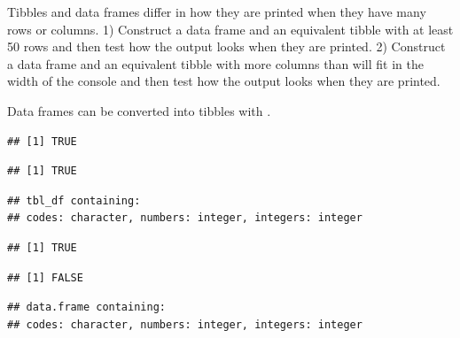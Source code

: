 \documentclass[krantz2]{krantz}\usepackage{knitr}
\begin{document}
\begin{playground}
Tibbles and data frames differ in how they are printed when they have many rows or columns. 1) Construct a data frame and an equivalent tibble with at least 50 rows and then test how the output looks when they are printed. 2) Construct a data frame and an equivalent tibble with more columns than will fit in the width of the \R console and then test how the output looks when they are printed.
\end{playground}

Data frames can be converted into tibbles with .

\begin{knitrout}\footnotesize
{}\color{fgcolor}\begin{kframe}
\begin{alltt}
 \hlkwb{<-} 
\end{alltt}
\begin{verbatim}
## [1] TRUE
\end{verbatim}
\begin{alltt}
\end{alltt}
\begin{verbatim}
## [1] TRUE
\end{verbatim}
\begin{alltt}
\end{alltt}
\begin{verbatim}
## tbl_df containing:
## codes: character, numbers: integer, integers: integer
\end{verbatim}
\end{kframe}
\end{knitrout}

\begin{knitrout}\footnotesize
{}\color{fgcolor}\begin{kframe}
\begin{alltt}
 \hlkwb{<-} 
\end{alltt}
\begin{verbatim}
## [1] TRUE
\end{verbatim}
\begin{alltt}
\end{alltt}
\begin{verbatim}
## [1] FALSE
\end{verbatim}
\begin{alltt}
\end{alltt}
\begin{verbatim}
## data.frame containing:
## codes: character, numbers: integer, integers: integer
\end{verbatim}
\end{kframe}
\end{knitrout}
\end{document}
